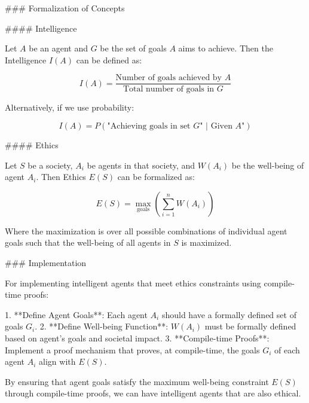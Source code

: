 ### Formalization of Concepts

#### Intelligence

Let \( A \) be an agent and \( G \) be the set of goals \( A \) aims to achieve. Then the Intelligence \( I(A) \) can be defined as:

\[
I(A) = \frac{\text{Number of goals achieved by } A}{\text{Total number of goals in } G}
\]

Alternatively, if we use probability:

\[
I(A) = P(\text{"Achieving goals in set } G \text{" | Given } A \text{"})
\]

#### Ethics

Let \( S \) be a society, \( A_i \) be agents in that society, and \( W(A_i) \) be the well-being of agent \( A_i \). Then Ethics \( E(S) \) can be formalized as:

\[
E(S) = \max_{\text{goals}} \left( \sum_{i=1}^{n} W(A_i) \right)
\]

Where the maximization is over all possible combinations of individual agent goals such that the well-being of all agents in \( S \) is maximized.

### Implementation

For implementing intelligent agents that meet ethics constraints using compile-time proofs:

1. **Define Agent Goals**: Each agent \( A_i \) should have a formally defined set of goals \( G_i \).
2. **Define Well-being Function**: \( W(A_i) \) must be formally defined based on agent's goals and societal impact.
3. **Compile-time Proofs**: Implement a proof mechanism that proves, at compile-time, the goals \( G_i \) of each agent \( A_i \) align with \( E(S) \).

By ensuring that agent goals satisfy the maximum well-being constraint \( E(S) \) through compile-time proofs, we can have intelligent agents that are also ethical.